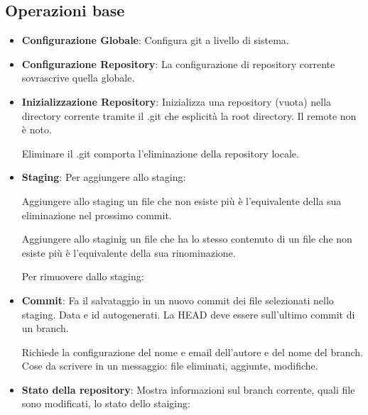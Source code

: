 \subsection{Operazioni base}
\begin{itemize}
	\item \textbf{Configurazione Globale}: Configura git a livello di sistema.


	\item \textbf{Configurazione Repository}: La configurazione di repository corrente sovrascrive quella globale.


	\item \textbf{Inizializzazione Repository}: Inizializza una repository (vuota) nella directory corrente tramite il .git che esplicità la root directory. Il remote non è noto.


	Eliminare il .git comporta l'eliminazione della repository locale.

	\item \textbf{Staging}: Per aggiungere allo staging:


	Aggiungere allo staging un file che non esiste più è l'equivalente della sua eliminazione nel prossimo commit.

	Aggiungere allo staginig un file che ha lo stesso contenuto di un file che non esiste più è l'equivalente della sua rinominazione.

	Per rimuovere dallo staging:


	\item \textbf{Commit}: Fa il salvataggio in un nuovo commit dei file selezionati nello staging. Data e id autogenerati.
	La HEAD deve essere sull'ultimo commit di un branch.


	Richiede la configurazione del nome e email dell'autore e del nome del branch.
	Cose da scrivere in un messaggio: file eliminati, aggiunte, modifiche.

	\item \textbf{Stato della repository}: Mostra informazioni sul branch corrente, quali file sono modificati, lo stato dello staiging:


\end{itemize}
